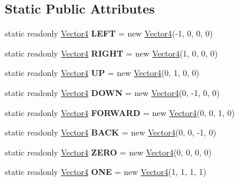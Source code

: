 \subsection*{Static Public Attributes}
\begin{DoxyCompactItemize}
\item 
\hypertarget{struct_engine_1_1_vector4_a45f7a60ddf5f974d217d699117e35996}{static readonly \hyperlink{struct_engine_1_1_vector4}{Vector4} {\bfseries L\-E\-F\-T} = new \hyperlink{struct_engine_1_1_vector4}{Vector4}(-\/1, 0, 0, 0)}\label{struct_engine_1_1_vector4_a45f7a60ddf5f974d217d699117e35996}

\item 
\hypertarget{struct_engine_1_1_vector4_a4a59cdcd72377634dfb85e4b636756bf}{static readonly \hyperlink{struct_engine_1_1_vector4}{Vector4} {\bfseries R\-I\-G\-H\-T} = new \hyperlink{struct_engine_1_1_vector4}{Vector4}(1, 0, 0, 0)}\label{struct_engine_1_1_vector4_a4a59cdcd72377634dfb85e4b636756bf}

\item 
\hypertarget{struct_engine_1_1_vector4_a8a8f494047a3d7245ffef459a53311b4}{static readonly \hyperlink{struct_engine_1_1_vector4}{Vector4} {\bfseries U\-P} = new \hyperlink{struct_engine_1_1_vector4}{Vector4}(0, 1, 0, 0)}\label{struct_engine_1_1_vector4_a8a8f494047a3d7245ffef459a53311b4}

\item 
\hypertarget{struct_engine_1_1_vector4_a0b7cd2138080b4aa2101661a9ea13a37}{static readonly \hyperlink{struct_engine_1_1_vector4}{Vector4} {\bfseries D\-O\-W\-N} = new \hyperlink{struct_engine_1_1_vector4}{Vector4}(0, -\/1, 0, 0)}\label{struct_engine_1_1_vector4_a0b7cd2138080b4aa2101661a9ea13a37}

\item 
\hypertarget{struct_engine_1_1_vector4_afa07b95a2da100e685a24580f902ae96}{static readonly \hyperlink{struct_engine_1_1_vector4}{Vector4} {\bfseries F\-O\-R\-W\-A\-R\-D} = new \hyperlink{struct_engine_1_1_vector4}{Vector4}(0, 0, 1, 0)}\label{struct_engine_1_1_vector4_afa07b95a2da100e685a24580f902ae96}

\item 
\hypertarget{struct_engine_1_1_vector4_a843b7b800e4c84440a926c470717be07}{static readonly \hyperlink{struct_engine_1_1_vector4}{Vector4} {\bfseries B\-A\-C\-K} = new \hyperlink{struct_engine_1_1_vector4}{Vector4}(0, 0, -\/1, 0)}\label{struct_engine_1_1_vector4_a843b7b800e4c84440a926c470717be07}

\item 
\hypertarget{struct_engine_1_1_vector4_afa84b6baaa27f0a1148ee15b0fabce97}{static readonly \hyperlink{struct_engine_1_1_vector4}{Vector4} {\bfseries Z\-E\-R\-O} = new \hyperlink{struct_engine_1_1_vector4}{Vector4}(0, 0, 0, 0)}\label{struct_engine_1_1_vector4_afa84b6baaa27f0a1148ee15b0fabce97}

\item 
\hypertarget{struct_engine_1_1_vector4_a964583aaea12f627c89625e60bdbebac}{static readonly \hyperlink{struct_engine_1_1_vector4}{Vector4} {\bfseries O\-N\-E} = new \hyperlink{struct_engine_1_1_vector4}{Vector4}(1, 1, 1, 1)}\label{struct_engine_1_1_vector4_a964583aaea12f627c89625e60bdbebac}

\end{DoxyCompactItemize}

